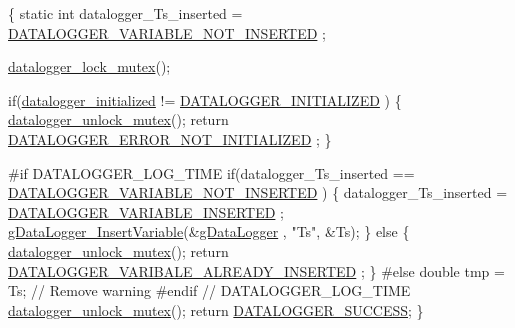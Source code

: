 \begin{DoxyCode}
\{
    \textcolor{keyword}{static} \textcolor{keywordtype}{int} datalogger\_Ts\_inserted = \hyperlink{datalogger_01_07Caio-PC's_01conflicted_01copy_012012-11-23_08_8h_a1f4fd2dbd981cf35467ab688c9157a74}{DATALOGGER\_VARIABLE\_NOT\_INSERTED}
      ;

    \hyperlink{datalogger_01_07Caio-PC's_01conflicted_01copy_012012-11-23_08_8c_a54b06d9395b2e370a5a72beb7f9524b2}{datalogger\_lock\_mutex}();

    \textcolor{keywordflow}{if}(\hyperlink{datalogger_01_07Caio-PC's_01conflicted_01copy_012012-11-23_08_8c_a35e8fbe04b90452afdc3c1be16ff6187}{datalogger\_initialized} != \hyperlink{datalogger_01_07Caio-PC's_01conflicted_01copy_012012-11-23_08_8h_a684c343d340004b77ca2b782934c96ca}{DATALOGGER\_INITIALIZED}
      )
    \{
        \hyperlink{datalogger_01_07Caio-PC's_01conflicted_01copy_012012-11-23_08_8c_a85453211c0c809083c36cc56b275aeeb}{datalogger\_unlock\_mutex}();
        \textcolor{keywordflow}{return} \hyperlink{datalogger_01_07Caio-PC's_01conflicted_01copy_012012-11-23_08_8h_a60df7fe0e61b757ad6a9db106b0eb43e}{DATALOGGER\_ERROR\_NOT\_INITIALIZED}
      ;
    \}

\textcolor{preprocessor}{    #if DATALOGGER\_LOG\_TIME}
\textcolor{preprocessor}{}    \textcolor{keywordflow}{if}(datalogger\_Ts\_inserted == \hyperlink{datalogger_01_07Caio-PC's_01conflicted_01copy_012012-11-23_08_8h_a1f4fd2dbd981cf35467ab688c9157a74}{DATALOGGER\_VARIABLE\_NOT\_INSERTED}
      )
    \{
        datalogger\_Ts\_inserted = \hyperlink{datalogger_01_07Caio-PC's_01conflicted_01copy_012012-11-23_08_8h_a181f9a0649abd26c74ed1a8a1710e25f}{DATALOGGER\_VARIABLE\_INSERTED}
      ;
        \hyperlink{gdatalogger_8c_a32674e7c2afa8b78e99a0070cf4bcaf9}{gDataLogger\_InsertVariable}(&\hyperlink{datalogger_01_07Caio-PC's_01conflicted_01copy_012012-11-23_08_8c_abe3b9c2c4e21e79c7b046b5986d13acc}{gDataLogger}
      , \textcolor{stringliteral}{"Ts"}, &Ts);
    \}
    \textcolor{keywordflow}{else}
        \{
        \hyperlink{datalogger_01_07Caio-PC's_01conflicted_01copy_012012-11-23_08_8c_a85453211c0c809083c36cc56b275aeeb}{datalogger\_unlock\_mutex}();
        \textcolor{keywordflow}{return} \hyperlink{datalogger_01_07Caio-PC's_01conflicted_01copy_012012-11-23_08_8h_ac76269a113d60c063e857d14e4a2f640}{DATALOGGER\_VARIBALE\_ALREADY\_INSERTED}
      ;
        \}
\textcolor{preprocessor}{    #else}
\textcolor{preprocessor}{}    \textcolor{keywordtype}{double} tmp = Ts; \textcolor{comment}{// Remove warning}
\textcolor{preprocessor}{    #endif // DATALOGGER\_LOG\_TIME}
\textcolor{preprocessor}{}
    \hyperlink{datalogger_01_07Caio-PC's_01conflicted_01copy_012012-11-23_08_8c_a85453211c0c809083c36cc56b275aeeb}{datalogger\_unlock\_mutex}();
    \textcolor{keywordflow}{return} \hyperlink{datalogger_01_07Caio-PC's_01conflicted_01copy_012012-11-23_08_8h_abddebaf71d26d40183fccbb1a766b983}{DATALOGGER\_SUCCESS};
\}
\end{DoxyCode}
